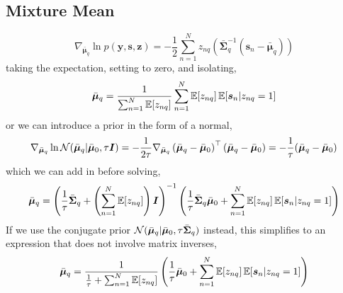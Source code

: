 \documentclass{article}
\newcommand{\source}{s}
\newcommand{\sourcevec}{\bm{\source}}
\newcommand{\obs}{y}
\newcommand{\obsvec}{\bm{\obs}}
\newcommand{\mean}{\mu}
\newcommand{\meanvec}{\bm{\mean}}
\newcommand{\assign}{z}
\newcommand{\assignvec}{\bm{\assign}}
\newcommand{\compmeanvec}{\bar{\meanvec}}
\newcommand{\compcov}{\bar{\bm{\Sigma}}}
\begin{document}
\subsection{Mixture Mean}
\begin{equation}
\nabla_{\compmeanvec_q}\ln p(\obsvec,\sourcevec,\assignvec)=-\frac{1}{2}\sum_{n=1}^{N}\assign_{nq}\left(\compcov_q^{-1}(\sourcevec_n-\compmeanvec_q)\right)
\end{equation}
taking the expectation, setting to zero, and isolating,
\begin{equation}
\compmeanvec_q=\frac{1}{\sum_{n=1}^{N}\E{\assign_{nq}}}\sum_{n=1}^{N}\E{\assign_{nq}}\E{\sourcevec_n|\assign_{nq}=1}
\end{equation}
or we can introduce a prior in the form of a normal, \begin{equation}
\nabla_{\compmeanvec_q}\ln\gaussrnd(\compmeanvec_q|\compmeanvec_0,\tau\bm{I})=-\frac{1}{2\tau}\nabla_{\compmeanvec_q}\left(\compmeanvec_q-\compmeanvec_0\right)\T\left(\compmeanvec_q-\compmeanvec_0\right)=-\frac{1}{\tau}(\compmeanvec_q-\compmeanvec_0)
\end{equation}
which we can add in before solving,
\begin{equation}
\compmeanvec_q=\left(\frac{1}{\tau}\compcov_q+\left(\sum_{n=1}^{N}\E{\assign_{nq}}\right)\bm{I}\right)^{-1}\left(\frac{1}{\tau}\compcov_q\compmeanvec_0+\sum_{n=1}^{N}\E{\assign_{nq}}\E{\sourcevec_n|\assign_{nq}=1}\right)
\end{equation}
If we use the conjugate prior $\gaussrnd(\compmeanvec_q|\compmeanvec_0,\tau\compcov_q)$ instead, this simplifies to an expression that does not involve matrix inverses,
\begin{equation}
\compmeanvec_q=\frac{1}{\frac{1}{\tau}+\sum_{n=1}^{N}\E{\assign_{nq}}}\left(\frac{1}{\tau}\compmeanvec_0+\sum_{n=1}^{N}\E{\assign_{nq}}\E{\sourcevec_n|\assign_{nq}=1}\right)
\end{equation}
\end{document}
